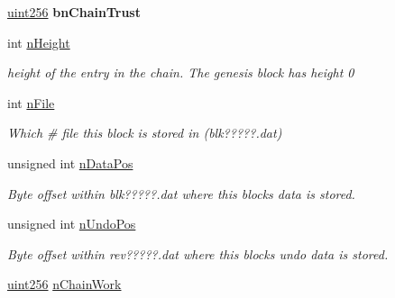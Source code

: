 \begin{DoxyCompactItemize}
\mbox{\label{class_c_block_index_a537fc664728daf6113e7e00e09444f55}} 
\mbox{\hyperlink{classuint256}{uint256}} {\bfseries bn\+Chain\+Trust}
\item 
\mbox{\label{class_c_block_index_aebfc8d6b95852546760e742553d7bfd5}} 
int \mbox{\hyperlink{class_c_block_index_aebfc8d6b95852546760e742553d7bfd5}{n\+Height}}
\begin{DoxyCompactList}\small\item\em height of the entry in the chain. The genesis block has height 0 \end{DoxyCompactList}\item 
\mbox{\label{class_c_block_index_a3653cb1e1bc3fa3fcdf1ed50ff93b50a}} 
int \mbox{\hyperlink{class_c_block_index_a3653cb1e1bc3fa3fcdf1ed50ff93b50a}{n\+File}}
\begin{DoxyCompactList}\small\item\em Which \# file this block is stored in (blk?????.dat) \end{DoxyCompactList}\item 
\mbox{\label{class_c_block_index_af164283dfb2d62ac44be8d10446bce4a}} 
unsigned int \mbox{\hyperlink{class_c_block_index_af164283dfb2d62ac44be8d10446bce4a}{n\+Data\+Pos}}
\begin{DoxyCompactList}\small\item\em Byte offset within blk?????.dat where this block\textquotesingle{}s data is stored. \end{DoxyCompactList}\item 
\mbox{\label{class_c_block_index_a865ddd56406c23e98cdc61511a61eb64}} 
unsigned int \mbox{\hyperlink{class_c_block_index_a865ddd56406c23e98cdc61511a61eb64}{n\+Undo\+Pos}}
\begin{DoxyCompactList}\small\item\em Byte offset within rev?????.dat where this block\textquotesingle{}s undo data is stored. \end{DoxyCompactList}\item 
\mbox{\label{class_c_block_index_a8451dbcf199348b9efe4ee3625e9b0f0}} 
\mbox{\hyperlink{classuint256}{uint256}} \mbox{\hyperlink{class_c_block_index_a8451dbcf199348b9efe4ee3625e9b0f0}{n\+Chain\+Work}}

\end{DoxyCompactItemize}
